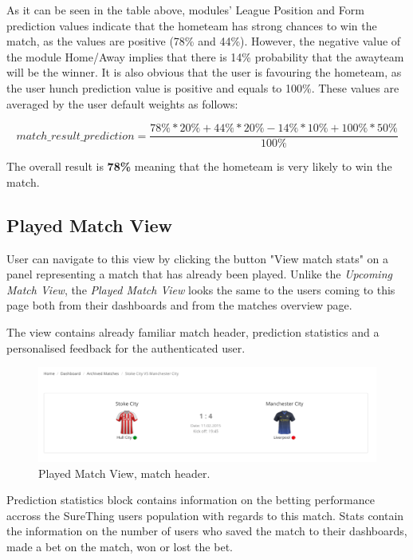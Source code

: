 As it can be seen in the table above, modules' League Position and Form prediction values indicate that the hometeam has strong chances to win the match, as the values are positive (78\% and 44\%). However, the negative value of the module Home/Away implies that there is 14\% probability that the awayteam will be the winner. It is also obvious that the user is favouring the hometeam, as the user hunch prediction value is positive and equals to 100\%. These values are averaged by the user default weights as follows: 

\begin{equation}
   match\_result\_prediction = \frac{78\%*20\% + 44\%*20\% -14\%*10\% + 100\%*50\%}{100\%}
\end{equation}

The overall result is \textbf{78\%} meaning that the hometeam is very likely to win the match.


\subsection{Played Match View}
\label{subsec:playedmatchview}
User can navigate to this view by clicking the button "View match stats" on a panel representing a match that has already been played. Unlike the \emph{Upcoming Match View}, the \emph{Played Match View} looks the same to the users coming to this page both from their dashboards and from the matches overview page. 

The view contains already familiar match header, prediction statistics and a personalised feedback for the authenticated user. 

\begin{figure}[H]
	\begin{center}
		\includegraphics[width=.90\textwidth]{impl/images/matchHeader}
		\caption{Played Match View, match header.} \label{fig:matchheader}
	\end{center}
\end{figure}

Prediction statistics block contains information on the betting performance accross the SureThing users population with regards to this match. Stats contain the information on the number of users who saved the match to their dashboards, made a bet on the match, won or lost the bet. 

